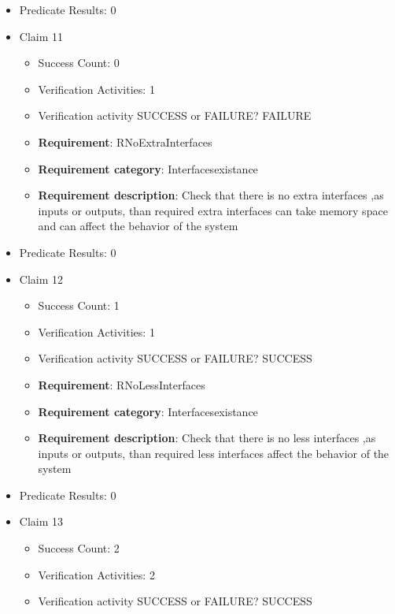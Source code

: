 \documentclass{article}
\begin{document}
\begin{itemize}
\begin{itemize}
				\end{itemize}
				
									    
				\item Predicate Results: 0

  				  \item Claim 11
				\begin{itemize}
			    	\item Success Count: 0 
			    	\item Verification Activities: 1
					\item Verification activity SUCCESS or FAILURE? FAILURE
		
						\item \textbf{Requirement}: RNoExtraInterfaces 
						\item \textbf{Requirement category}: Interfacesexistance 
						\item \textbf{Requirement description}: Check that there is no extra interfaces ,as inputs or outputs, than required  extra interfaces can take memory space and can affect the behavior of the system
					
				\end{itemize}
				
									    
				\item Predicate Results: 0

  				  \item Claim 12
				\begin{itemize}
			    	\item Success Count: 1 
			    	\item Verification Activities: 1
					\item Verification activity SUCCESS or FAILURE? SUCCESS
		
						\item \textbf{Requirement}: RNoLessInterfaces 
						\item \textbf{Requirement category}: Interfacesexistance 
						\item \textbf{Requirement description}: Check that there is no less interfaces ,as inputs or outputs, than required  less interfaces affect the behavior of the system
					
				\end{itemize}
				
									    
				\item Predicate Results: 0

  				  \item Claim 13
				\begin{itemize}
			    	\item Success Count: 2 
			    	\item Verification Activities: 2
					\item Verification activity SUCCESS or FAILURE? SUCCESS
		

\end{itemize}
\end{itemize}
\end{document}
